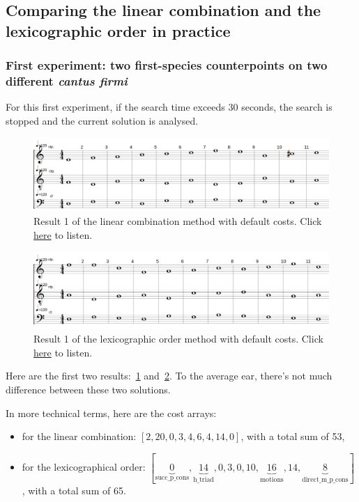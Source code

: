 \subsection{Comparing the linear combination and the lexicographic order in practice}
\subsubsection{First experiment: two first-species counterpoints on two different \textit{cantus firmi}}
For this first experiment, if the search time exceeds 30 seconds, the search is stopped and the current solution is analysed.
\begin{figure}[h]
    \centering
    \includegraphics[width=1\textwidth]{Images/Experiments/linear-combination-1sp.png}
    \caption{Result 1 of the linear combination method with default costs. Click \href{https://youtu.be/w7EQ3b8JHnM}{here} to listen.}
    \label{fig:combili-1sp}
\end{figure}

\begin{figure}[h]
    \centering
    \includegraphics[width=1\textwidth]{Images/Experiments/basic-lexico-1sp.png}
    \caption{Result 1 of the lexicographic order method with default costs. Click \href{https://youtu.be/ryrpi5QNmf0}{here} to listen.}
    \label{fig:lexico-1sp}
\end{figure}

Here are the first two results:~\ref{fig:combili-1sp} and~\ref{fig:lexico-1sp}. To the average ear, there's not much difference between these two solutions.

In more technical terms, here are the cost arrays: 
\begin{itemize}
    \item for the linear combination: $[2, 20, 0, 3, 4, 6, 4, 14, 0]$, with a total sum of 53,
    \item for the lexicographical order: $[\underset{\text{succ\_p\_cons}}{\underbrace{0}}, \underset{\text{h\_triad}}{\underbrace{14}}, 0, 3, 0, 10, \underset{\text{motions}}{\underbrace{16}}, 14, \underset{\text{direct\_m\_p\_cons}}{\underbrace{8}}]$, with a total sum of 65.
\end{itemize}

